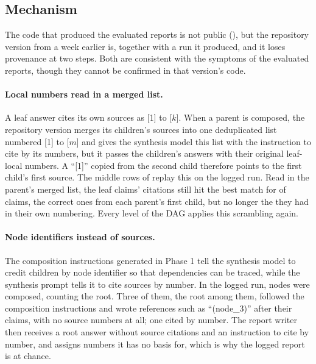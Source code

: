 \subsection{Mechanism}
\label{sec:mechanism}
The code that produced the evaluated reports is not public (), but the repository version from a week earlier is, together with a run it produced, and it loses provenance at two steps. Both are consistent with the symptoms of the evaluated reports, though they cannot be confirmed in that version's code.

\paragraph{Local numbers read in a merged list.}
A leaf answer cites its own sources as [1] to [$k$]. When a parent is composed, the repository version merges its children's sources into one deduplicated list numbered [1] to [$m$] and gives the synthesis model this list with the instruction to cite by its numbers, but it passes the children's answers with their original leaf-local numbers. A ``[1]'' copied from the second child therefore points to the first child's first source. The middle rows of  replay this on the logged run. Read in the parent's merged list, the leaf claims' citations still hit the best match for \atOldBestCited{} of claims, the correct ones from each parent's first child, but no longer the \atValBestCited{} they had in their own numbering. Every level of the DAG applies this scrambling again.

\paragraph{Node identifiers instead of sources.}
The composition instructions generated in Phase 1 tell the synthesis model to credit children by node identifier so that dependencies can be traced, while the synthesis prompt tells it to cite sources by number. In the logged run, \dagParents{} nodes were composed, counting the root. Three of them, the root among them, followed the composition instructions and wrote references such as ``(node\_3)'' after their claims, with no source numbers at all; one cited by number. The report writer then receives a root answer without source citations and an instruction to cite by number, and assigns numbers it has no basis for, which is why the logged report is at chance.

